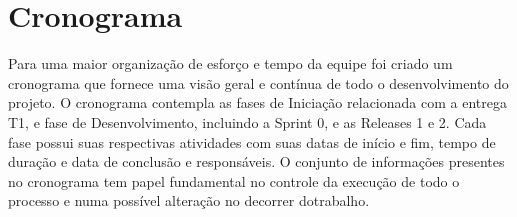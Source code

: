 \section{Cronograma}

	Para uma maior organização de esforço e tempo da equipe foi criado um cronograma que fornece uma visão geral e contínua de todo o desenvolvimento do projeto.  O cronograma contempla as fases de Iniciação relacionada com a entrega T1, e fase de Desenvolvimento, incluindo a Sprint 0, e as Releases 1 e 2. Cada fase possui suas respectivas atividades com suas datas de início e fim, tempo de duração e data de conclusão e responsáveis. O conjunto de informações presentes no cronograma tem papel fundamental no controle da execução de todo o processo e numa possível alteração no decorrer dotrabalho.